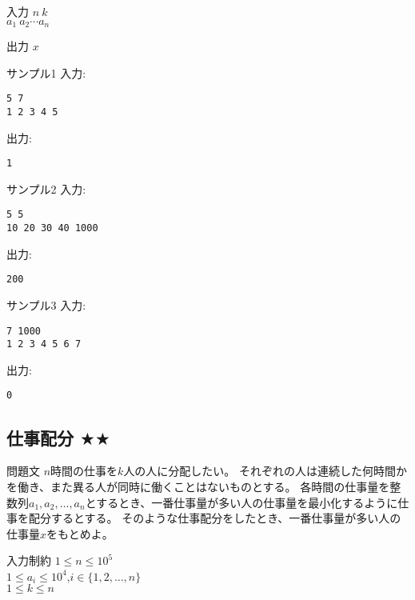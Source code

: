 \documentclass[a4paper,twoside,onecolumn,openany,article,10pt]{memoir}
\theoremstyle{remark}
\begin{document}
\begin{itembox}[l]{入力}
$n~k$\\
$a_1~a_2 \dotsb a_n$
\end{itembox}

\begin{itembox}[l]{出力}
$x$
\end{itembox}

\begin{itembox}[l]{サンプル1}
入力:
\begin{verbatim}
5 7
1 2 3 4 5
\end{verbatim}
出力:
\begin{verbatim}
1
\end{verbatim}
\end{itembox}

\begin{itembox}[l]{サンプル2}
入力:
\begin{verbatim}
5 5
10 20 30 40 1000
\end{verbatim}
出力:
\begin{verbatim}
200
\end{verbatim}
\end{itembox}

\begin{itembox}[l]{サンプル3}
入力:
\begin{verbatim}
7 1000
1 2 3 4 5 6 7
\end{verbatim}
出力:
\begin{verbatim}
0
\end{verbatim}
\end{itembox}



\clearpage
\subsection{仕事配分 $\bigstar\bigstar$}
\begin{itembox}[l]{問題文}
$n$時間の仕事を$k$人の人に分配したい。
それぞれの人は連続した何時間かを働き、また異る人が同時に働くことはないものとする。
各時間の仕事量を整数列$a_1,a_2,\dotsc,a_n$とするとき、一番仕事量が多い人の仕事量を最小化するように仕事を配分するとする。
そのような仕事配分をしたとき、一番仕事量が多い人の仕事量$x$をもとめよ。
\end{itembox}

\begin{itembox}[l]{入力制約}
$1\le n\le 10^5$\\
$1\le a_i\le 10^4$,\hspace{2em}$i\in\{1,2,\dotsc,n\}$\\
$1\le k\le n$
\end{itembox}
\end{document}
